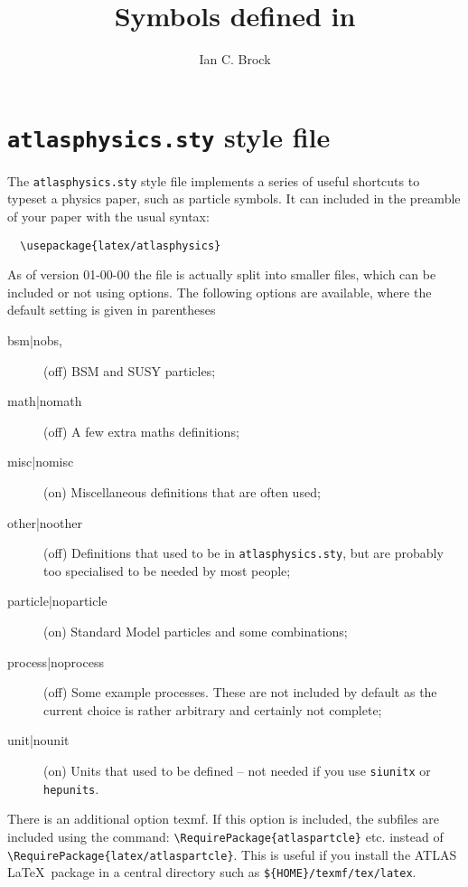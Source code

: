 \documentclass[koma,UKenglish]{latex/atlasdoc}
\title{Symbols defined in \File{atlasphysics.sty}}
\author{Ian C. Brock}
\affil{University of Bonn}
\newcommand{\File}[1]{\texttt{#1}\xspace}
\newcommand{\Option}[1]{\textsf{#1}\xspace}
\newcommand{\Package}[1]{\texttt{#1}\xspace}
\begin{document}
\tableofcontents

\section{\File{atlasphysics.sty} style file}
\label{sec:atlasphysics}

The \File{atlasphysics.sty} style file implements a series of useful
shortcuts to typeset a physics paper, such as particle
symbols. It can included in the preamble of your paper with the usual
syntax:
%
\begin{verbatim}
  \usepackage{latex/atlasphysics}
\end{verbatim}
%
As of version 01-00-00 the file is actually split into smaller files,
which can be included or not using options.
The following options are available, where the default setting is given in parentheses
\begin{description}
\item[bsm|nobs,](off) BSM and SUSY particles;
\item[math|nomath] (off) A few extra maths definitions;
\item[misc|nomisc](on) Miscellaneous definitions that are often used;
\item[other|noother](off) Definitions that used to be in \File{atlasphysics.sty}, 
	but are probably too specialised to be needed by most people;
\item[particle|noparticle](on) Standard Model particles and some combinations;
\item[process|noprocess](off) Some example processes. 
	These are not included by default as the current choice is rather arbitrary
	and certainly not complete;
\item[unit|nounit](on) Units that used to be defined -- not needed if you use \Package{siunitx} or \Package{hepunits}.
\end{description}

There is an additional option \Option{texmf}.
If this option is included, the subfiles are included using the command:
\verb|\RequirePackage{atlaspartcle}| etc. instead of \verb|\RequirePackage{latex/atlaspartcle}|.
This is useful if you install the ATLAS \LaTeX\ package in a central directory such as \File{\$\{HOME\}/texmf/tex/latex}.
\end{document}
